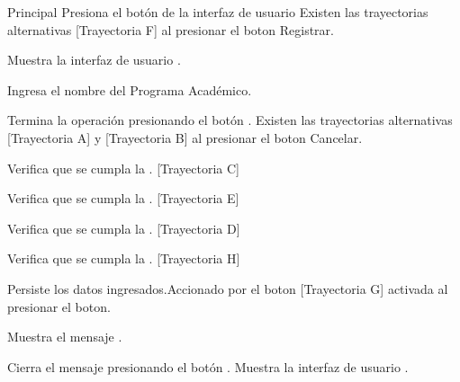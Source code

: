 \begin{UCtrayectoria}{Principal}
    \UCpaso[\UCactor] Presiona el botón de la interfaz de usuario Existen las trayectorias alternativas [Trayectoria F] al presionar el boton Registrar.   

    \UCpaso Muestra la interfaz de usuario .

    \UCpaso[\UCactor] Ingresa el nombre del Programa Académico.

    \UCpaso[\UCactor] Termina la operación presionando el botón . Existen las trayectorias alternativas [Trayectoria A] y [Trayectoria B] al presionar el boton Cancelar.

    \UCpaso Verifica que se cumpla la . [Trayectoria C]

    \UCpaso Verifica que se cumpla la . [Trayectoria E]

    \UCpaso Verifica que se cumpla la . [Trayectoria D]    

    \UCpaso Verifica que se cumpla la . [Trayectoria H]    

    \UCpaso Persiste los datos ingresados.Accionado por el boton  [Trayectoria G] activada al presionar el boton.

    \UCpaso Muestra el mensaje .

    \UCpaso[\UCactor] Cierra el mensaje presionando el botón .
    \UCpaso Muestra la interfaz de usuario .
\end{UCtrayectoria}

